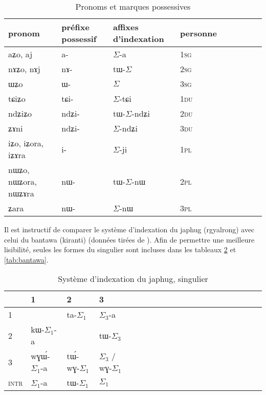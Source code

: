 \documentclass[oldfontcommands,oneside,a4paper,11pt]{article}
\newcommand{\ipa}[1]{{\phon \mbox{#1}}} %
\newcommand{\grise}[1]{\cellcolor{lightgray}\textbf{#1}}
\newcommand{\ra}{$\Sigma_1$}
\newcommand{\rc}{$\Sigma_3$}
\newcommand{\ro}{$\Sigma$}
\begin{document}
\begin{table}[H] \centering
\caption{Pronoms et marques possessives }\label{tab:pronoms}
\begin{tabular}{lllllllll} 
\toprule
pronom & préfixe possessif & affixes d'indexation& personne \\
\midrule
 \ipa{aʑo},    \ipa{aj} &	\ipa{a-}  &	\ro{}-\ipa{a}	& 1\textsc{sg} \\
\ipa{nɤʑo},  \ipa{nɤj} &	\ipa{nɤ-}  &	\ipa{tɯ-}\ro{} &		2\textsc{sg}\\
\ipa{ɯʑo}  &	\ipa{ɯ-}  &	\ro{} 	&	3\textsc{sg}\\
\midrule
\ipa{tɕiʑo}  &	\ipa{tɕi-}  &			\ro{}-\ipa{tɕi}	&	1\textsc{du} \\
\ipa{ndʑiʑo}  &	\ipa{ndʑi-}  &		\ipa{tɯ-}\ro{}-\ipa{ndʑi} &		2\textsc{du} \\	
\ipa{ʑɤni}  &	\ipa{ndʑi-}  &	\ro{}-\ipa{ndʑi} &		3\textsc{du} \\	
\midrule
\ipa{iʑo}, \ipa{iʑora},   \ipa{iʑɤra}   &	\ipa{i-}  &	\ro{}-\ipa{ji}	&		1\textsc{pl} \\
\ipa{nɯʑo}, \ipa{nɯʑora},   \ipa{nɯʑɤra}  &	\ipa{nɯ-}  &	\ipa{tɯ-}\ro{}-\ipa{nɯ} &			2\textsc{pl} \\
\ipa{ʑara}  &	\ipa{nɯ-}  &			\ro{}-\ipa{nɯ} &3\textsc{pl} \\
\bottomrule
\end{tabular}
\end{table}


 

Il est instructif de comparer le système d'indexation du japhug (rgyalrong) avec celui du bantawa (kiranti) (données tirées de \citealt{jacques10inverse, doornenbal09}). Afin de permettre une meilleure lisibilité, seules les formes du singulier sont incluses dans les tableaux \ref{tab:japhug} et \ref{tab:bantawa}.

 

\begin{table}[H]
\caption{Système d'indexation du japhug, singulier} \centering \label{tab:japhug}
\begin{tabular}{l|lllllllllllllllllll}
\toprule
&1 & 2 &3 &\\
\midrule
1 &\grise{}&\ipa{ta}-\ra{} & \rc{}-\ipa{a}	 \\
2 &\ipa{kɯ}-\ra{}-\ipa{a}	 &\grise{} &\ipa{tɯ-}\rc{} \\
3 &\ipa{wɣɯ́-}\ra{}-\ipa{a}&\ipa{tɯ́-wɣ-}\ra{}& \rc{} / \ipa{wɣ}-\ra{}\\
\midrule
\textsc{intr} & \ra{}-\ipa{a}&\ipa{tɯ-}\ra{}&\ra{} \\
\bottomrule
\end{tabular}
\end{table}
\end{document}
